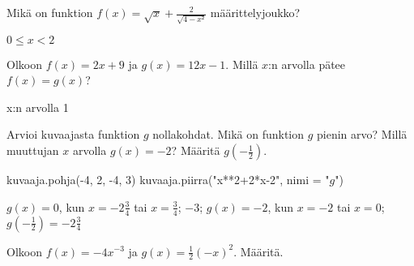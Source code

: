 \begin{tehtava}
	Mikä on funktion $f(x)=\sqrt{x}+\frac{2}{\sqrt{4-x²}}$ määrittelyjoukko?
	

\begin{vastaus}
	{$0\leq x<2$}
		
\end{vastaus}
\end{tehtava}

\begin{tehtava}
	Olkoon $f(x)=2x+9$ ja $g(x)=12x-1$. Millä $x$:n arvolla pätee $f(x)=g(x)$? 
	

\begin{vastaus}
	{x:n arvolla 1}
		
\end{vastaus}
\end{tehtava}

\begin{tehtava}
Arvioi kuvaajasta funktion $g$ nollakohdat. Mikä on funktion $g$ pienin arvo? Millä muuttujan $x$ arvolla $g(x)=-2$? Määritä $g\left(-\frac{1}{2}\right)$.
\begin{kuva}
    kuvaaja.pohja(-4, 2, -4, 3)
    kuvaaja.piirra("x**2+2*x-2", nimi = "$g$")
\end{kuva}

\begin{vastaus}
	{$g(x)=0$, kun $x=-2\frac{3}{4}$ tai $x=\frac{3}{4}$; $-3$; $g(x)=-2$, kun $x=-2$ tai $x=0$; $g\left(-\frac{1}{2}\right)=-2\frac{3}{4}$}
		
\end{vastaus}
\end{tehtava}

\begin{tehtava}
	Olkoon $f(x)=-4x^{-3}$ ja $g(x)=\frac{1}{2}(-x)^{2}$. Määritä.
	
	
\begin{vastaus}
\end{vastaus}
\end{tehtava}


